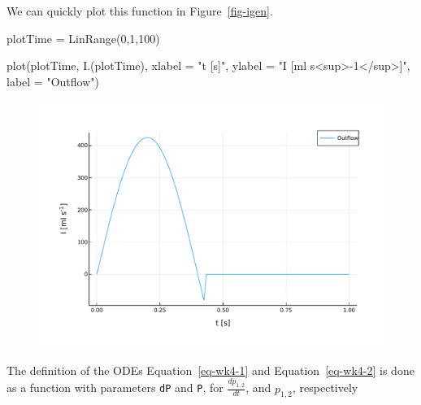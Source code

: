 \documentclass[
  a4paper,
  DIV=11,
  numbers=noendperiod,
  oneside]{scrreprt}
\newenvironment{Shaded}{\begin{snugshade}}{\end{snugshade}}
\newcommand{\FloatTok}[1]{\textcolor[rgb]{0.68,0.00,0.00}{#1}}
\newcommand{\FunctionTok}[1]{\textcolor[rgb]{0.28,0.35,0.67}{#1}}
\newcommand{\NormalTok}[1]{\textcolor[rgb]{0.00,0.23,0.31}{#1}}
\newcommand{\OperatorTok}[1]{\textcolor[rgb]{0.37,0.37,0.37}{#1}}
\newcommand{\StringTok}[1]{\textcolor[rgb]{0.13,0.47,0.30}{#1}}
\begin{document}
We can quickly plot this function in Figure~\ref{fig-igen}.

\begin{Shaded}
\begin{Highlighting}[]
\NormalTok{plotTime }\OperatorTok{=} \FunctionTok{LinRange}\NormalTok{(}\FloatTok{0}\NormalTok{,}\FloatTok{1}\NormalTok{,}\FloatTok{100}\NormalTok{)}

\FunctionTok{plot}\NormalTok{(plotTime, }\FunctionTok{I}\NormalTok{.(plotTime),}
\NormalTok{     xlabel }\OperatorTok{=} \StringTok{"t [s]"}\NormalTok{, ylabel }\OperatorTok{=} \StringTok{"I [ml s\textless{}sup\textgreater{}{-}1\textless{}/sup\textgreater{}]"}\NormalTok{, label }\OperatorTok{=} \StringTok{"Outflow"}\NormalTok{) }
\end{Highlighting}
\end{Shaded}

\begin{figure}[H]


{\centering \includegraphics{ODEsolver_files/mediabag/ODEsolver_files/figure-pdf/fig-igen-output-1.pdf}

}

\end{figure}

The definition of the ODEs Equation~\ref{eq-wk4-1} and
Equation~\ref{eq-wk4-2} is done as a function with parameters
\texttt{dP} and \texttt{P}, for \(\frac{d p_{1,2}}{d t}\), and
\(p_{1,2}\), respectively
\end{document}
